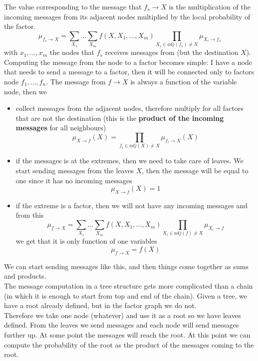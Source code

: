 The value corresponding to the message that $f_{s} \rightarrow X$ is the
multiplication of the incoming messages from its adjacent nodes multiplied by
the local probability of the factor.
\[
	\mu_{f_s \rightarrow X}= \sum_{X_1}\dots\sum_{X_{m}}f(X, X_{1}, \dots, X_{m}) \prod
	_{X_i \in adj(f_s) \neq X}\mu_{X_i \rightarrow f_s}
\]
with $x_{1}, \dots, x_{m}$ the nodes that $f_{s}$ receives messages from (but
the destination $X$).\\

Computing the message from the node to a factor becomes simple: I have a node that
needs to send a message to a factor, then it will be connected only to factors
node $f_{1}, \dots, f_{n}$. The message from $f \rightarrow X$ is always a function
of the variable node, then we
\begin{itemize}
	\item collect messages from the adjacent nodes, therefore multiply for all
		factors that are not the destination (this is the \textbf{product of the
		incoming messages} for all neighbours)
		\[
			\mu_{X \rightarrow f}(X) = \prod_{f_i \in adj(X) \neq X}\mu_{f_i
			\rightarrow X}(X)
		\]

	\item if the messages is at the extremes, then we need to take care of leaves.
		We start sending messages from the leaves $X$, then the message will be
		equal to one since it has no incoming messages
		\[
			\mu_{X \rightarrow f}(X) = 1
		\]

	\item if the extreme is a factor, then we will not have any incoming messages
		and from this
		\[
			\mu_{f \rightarrow X}= \sum_{X_1}\dots\sum_{X_{m}}f(X, X_{1}, \dots, X_{m})
			\prod_{X_i \in adj(f) \neq X}\mu_{X_i \rightarrow f}
		\]
		we get that it is only function of one variables
		\[
			\mu_{f \rightarrow X}= f(X)
		\]
\end{itemize}
We can start sending messages like this, and then things come together as sums and
products.\\

The message computation in a tree structure gets more complicated than a chain (in
which it is enough to start from top and end of the chain). Given a tree, we
have a root already defined, but in the factor graph we do not.\\ Therefore we take
one node (whatever) and use it as a root so we have leaves defined. From the
leaves we send messages and each node will send messages further up. At some point
the messages will reach the root. At this point we can compute the probability
of the root as the product of the messages coming to the root.

